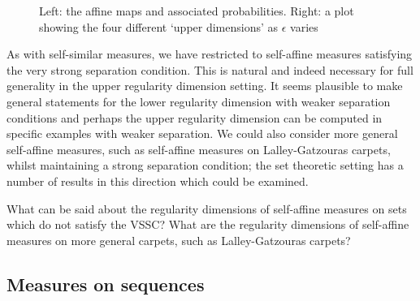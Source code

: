 \begin{figure}[H]
\begin{minipage}{.5\textwidth}
		
	\end{minipage}
	
	\caption{Left: the affine maps and associated probabilities.  Right: a plot showing the four different `upper dimensions' as $\epsilon$ varies}
	\label{ch-upper-reg:fig:badcarpet}
\end{figure}

As with self-similar measures, we have restricted to self-affine measures satisfying the very strong separation condition. This is natural and indeed necessary for full generality in the upper regularity dimension setting. It seems plausible to make general statements for the lower regularity dimension with weaker separation conditions and perhaps the upper regularity dimension can be computed in specific examples with weaker separation. We could also consider more general self-affine measures, such as self-affine measures on Lalley-Gatzouras carpets, whilst maintaining a strong separation condition; the set theoretic setting has a number of results in this direction which could be examined.

\begin{question}
What can be said about the regularity dimensions of self-affine measures on sets which do not satisfy the VSSC? What are the regularity dimensions of self-affine measures on more general carpets, such as Lalley-Gatzouras carpets?
\end{question}


\subsection{Measures on sequences}\label{ch-upper-reg:sec:sequences}

